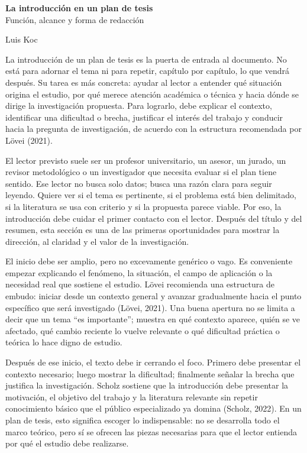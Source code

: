 \documentclass[11pt]{article}
\begin{document}
\begin{center}
{\Large \textbf{La introducción en un plan de tesis}}\\[0.3em]
{\large Función, alcance y forma de redacción}
\end{center}

Luis Koc 

La introducción de un plan de tesis es la puerta de entrada al documento. No está para adornar el tema ni para repetir, capítulo por capítulo, lo que vendrá después. Su tarea es más concreta: ayudar al lector a entender qué situación origina el estudio, por qué merece atención académica o técnica y hacia dónde se dirige la investigación propuesta. Para lograrlo, debe explicar el contexto, identificar una dificultad o brecha, justificar el interés del trabajo y conducir hacia la pregunta de investigación, de acuerdo con la estructura recomendada por Lövei (2021).

El lector previsto suele ser un profesor universitario, un asesor, un jurado, un revisor metodológico o un investigador que necesita evaluar si el plan tiene sentido. Ese lector no busca solo datos; busca una razón clara para seguir leyendo. Quiere ver si el tema es pertinente, si el problema está bien delimitado, si la literatura se usa con criterio y si la propuesta parece viable. Por eso, la introducción debe cuidar el primer contacto con el lector. Después del título y del resumen, esta sección es una de las primeras oportunidades para mostrar la dirección, al claridad y el valor de la investigación.

El inicio debe ser amplio, pero no excevamente genérico o vago. Es conveniente empezar explicando el fenómeno, la situación, el campo de aplicación o la necesidad real que sostiene el estudio. Lövei recomienda una estructura de embudo: iniciar desde un contexto general y avanzar gradualmente hacia el punto específico que será investigado (Lövei, 2021). Una buena apertura no se limita a decir que un tema ``es importante''; muestra en qué contexto aparece, quién se ve afectado, qué cambio reciente lo vuelve relevante o qué dificultad práctica o teórica lo hace digno de estudio.

Después de ese inicio, el texto debe ir cerrando el foco. Primero debe presentar el contexto necesario; luego mostrar la dificultad; finalmente señalar la brecha que justifica la investigación. Scholz sostiene que la introducción debe presentar la motivación, el objetivo del trabajo y la literatura relevante sin repetir conocimiento básico que el público especializado ya domina (Scholz, 2022). En un plan de tesis, esto significa escoger lo indispensable: no se desarrolla todo el marco teórico, pero sí se ofrecen las piezas necesarias para que el lector entienda por qué el estudio debe realizarse.
\end{document}
